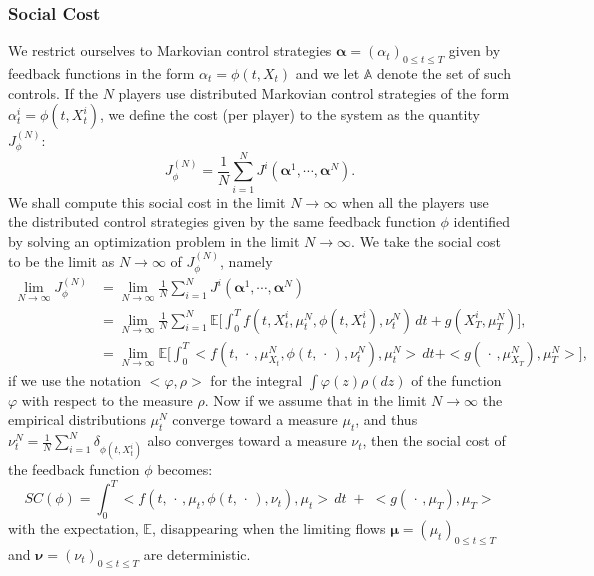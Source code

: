\documentclass[11pt]{article}
\def\balpha{\boldsymbol{\alpha}}
\def\bmu{\boldsymbol{\mu}}
\def\bnu{\boldsymbol{\nu}}
\newcommand\EE{\mathbb E}
\begin{document}
\subsubsection*{\textbf{Social Cost}}
We restrict ourselves to Markovian control strategies $\balpha=(\alpha_t)_{0\le t\le T}$ given by feedback functions in the form $\alpha_t=\phi(t,X_{t})$ and we let $\mathbb{A}$ denote the set of such controls. If the $N$ players use distributed Markovian control strategies of the form $\alpha^i_t=\phi(t,X^i_t)$, we define the cost (per player) to the system as the quantity $J^{(N)}_\phi$:
\begin{equation*}
J^{(N)}_\phi=\frac1N\sum_{i=1}^NJ^i(\balpha^1,\cdots,\balpha^N).
\end{equation*}
We shall compute this social cost in the limit $N\to\infty$ when all the players use the distributed control strategies given by the same feedback function $\phi$ identified by solving an optimization problem in the limit $N\to\infty$. We take the social cost to be the limit as $N\to\infty$ of $J^{(N)}_\phi$, namely
\begin{equation*}
\begin{split}
\lim_{N\to\infty}J^{(N)}_\phi
&=\lim_{N\to\infty}\frac1N\sum_{i=1}^NJ^i(\balpha^1,\cdots,\balpha^N)\\
&=\lim_{N\to\infty}\frac1N\sum_{i=1}^N\EE\bigg[\int_0^Tf(t,X^i_t,\mu^{N}_{t},\phi(t,X^i_t),\nu^{N}_{t})\,dt +g(X^i_T,\mu^{N}_{T})
\bigg],\\
&=\lim_{N\to\infty}\EE\bigg[\int_0^T<f(t,\,\cdot\,,\mu^{N}_{X_t},\phi(t,\,\cdot\,),\nu^{N}_{t}),\mu^N_{t}>\,dt +<g(\,\cdot\,,\mu^{N}_{X_T}),\mu^{N}_{T}>
\bigg],
\end{split}
\end{equation*}
if we use the notation $<\varphi,\rho>$ for the integral $\int \varphi(z)\rho(dz)$ of the function $\varphi$ with respect to the measure $\rho$. Now if we assume that in the limit $N\to\infty$ the empirical distributions $\mu^N_{t}$ converge toward a measure $\mu_t$, and thus $\nu^N_{t}=\frac1N\sum_{i=1}^N\delta_{\phi(t,X^i_t)}$ also converges toward a measure $\nu_t$, then the social cost of the feedback function $\phi$ becomes:
\begin{equation*}
SC(\phi)=\int_0^T<f(t,\,\cdot\,,\mu_t,\phi(t,\,\cdot\,),\nu_t),\mu_t>\,dt \;+\; <g(\,\cdot\,,\mu_T),\mu_T>
\end{equation*}
with the expectation, $\EE$, disappearing when the limiting flows $\bmu=(\mu_t)_{0\le t\le T}$ and $\bnu=(\nu_t)_{0\le t\le T}$ are deterministic.
\end{document}
